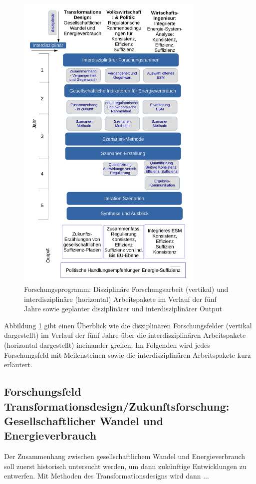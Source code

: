\documentclass[a4paper,11pt,twoside]{scrartcl}
\begin{document}

\begin{figure}[!h]
    \centering
    \includegraphics[width=0.8\textwidth]{figures/Forschungsarbeit.pdf}
    \caption{Forschungsprogramm: Disziplinäre Forschungsarbeit (vertikal) und  interdisziplinäre (horizontal) Arbeitspakete im Verlauf der fünf Jahre sowie geplanter disziplinärer und interdisziplinärer Output}
    \label{fig:forschungsprogramm}
\end{figure}

Abbildung \ref{fig:forschungsprogramm} gibt einen Überblick wie die disziplinären Forschungsfelder (vertikal dargestellt) im Verlauf der fünf Jahre über die interdisziplinären Arbeitspakete (horizontal dargestellt) ineinander greifen. Im Folgenden wird jedes Forschungsfeld mit Meilensteinen sowie die interdisziplinären Arbeitspakete kurz erläutert.

\subsection*{Forschungsfeld Transformationsdesign/Zukunftsforschung: Gesellschaftlicher Wandel und Energieverbrauch}
Der Zusammenhang zwischen gesellschaftlichem Wandel und Energieverbrauch soll zuerst historisch untersucht werden, um dann zukünftige Entwicklungen zu entwerfen. Mit Methoden des Transformationsdesigns wird dann ...
\end{document}
